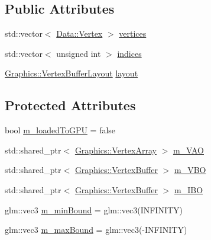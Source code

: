 \subsection*{Public Attributes}
\begin{DoxyCompactItemize}
\item 
std\+::vector$<$ \hyperlink{struct_cookie_eng_1_1_data_1_1_vertex}{Data\+::\+Vertex} $>$ \hyperlink{struct_cookie_eng_1_1_resources_1_1_mesh_aa2d9365b3bb9855de51053a1bbde84a1}{vertices}
\item 
std\+::vector$<$ unsigned int $>$ \hyperlink{struct_cookie_eng_1_1_resources_1_1_mesh_a78ad4658bc848293472999b4708b85ab}{indices}
\item 
\hyperlink{class_cookie_eng_1_1_graphics_1_1_vertex_buffer_layout}{Graphics\+::\+Vertex\+Buffer\+Layout} \hyperlink{struct_cookie_eng_1_1_resources_1_1_mesh_a7d60f959cc5a9cadbc59299e207032f2}{layout}
\end{DoxyCompactItemize}
\subsection*{Protected Attributes}
\begin{DoxyCompactItemize}
\item 
bool \hyperlink{struct_cookie_eng_1_1_resources_1_1_mesh_aa244e9f1890ccfa204a3d7df97a3b056}{m\+\_\+loaded\+To\+G\+PU} = false
\item 
std\+::shared\+\_\+ptr$<$ \hyperlink{class_cookie_eng_1_1_graphics_1_1_vertex_array}{Graphics\+::\+Vertex\+Array} $>$ \hyperlink{struct_cookie_eng_1_1_resources_1_1_mesh_a2d54038e4b55e1733fcc7e8c64969767}{m\+\_\+\+V\+AO}
\item 
std\+::shared\+\_\+ptr$<$ \hyperlink{class_cookie_eng_1_1_graphics_1_1_vertex_buffer}{Graphics\+::\+Vertex\+Buffer} $>$ \hyperlink{struct_cookie_eng_1_1_resources_1_1_mesh_a3420e235a3449e5d8f15378b410d89bd}{m\+\_\+\+V\+BO}
\item 
std\+::shared\+\_\+ptr$<$ \hyperlink{class_cookie_eng_1_1_graphics_1_1_vertex_buffer}{Graphics\+::\+Vertex\+Buffer} $>$ \hyperlink{struct_cookie_eng_1_1_resources_1_1_mesh_aff20a2371d9413acc57ab5ff9086fa15}{m\+\_\+\+I\+BO}
\item 
glm\+::vec3 \hyperlink{struct_cookie_eng_1_1_resources_1_1_mesh_a15be180ae31ec95a947b3f716a082a99}{m\+\_\+min\+Bound} = glm\+::vec3(I\+N\+F\+I\+N\+I\+TY)
\item 
glm\+::vec3 \hyperlink{struct_cookie_eng_1_1_resources_1_1_mesh_a7a4f588b705bf49e406ad66d1165534c}{m\+\_\+max\+Bound} = glm\+::vec3(-\/I\+N\+F\+I\+N\+I\+TY)
\end{DoxyCompactItemize}


